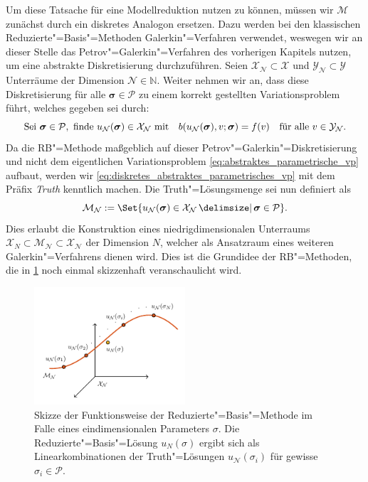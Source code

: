\documentclass[../main.tex]{subfiles}
\begin{document}
Um diese Tatsache für eine Modellreduktion nutzen zu können, müssen wir $\mathcal M$ zunächst durch ein diskretes Analogon ersetzen.
Dazu werden bei den klassischen Reduzierte"=Basis"=Methoden Galerkin"=Verfahren verwendet, weswegen wir an dieser Stelle das Petrov"=Galerkin"=Verfahren des vorherigen Kapitels nutzen, um eine abstrakte Diskretisierung durchzuführen.
Seien $\mathcal X_{\mathcal N} \subset \mathcal X$ und $\mathcal Y_{\mathcal N} \subset \mathcal Y$ Unterräume der Dimension $\mathcal N \in \mathbb{N}$.
Weiter nehmen wir an, dass diese Diskretisierung für alle $\bm \sigma \in \mathcal P$ zu einem korrekt gestellten Variationsproblem führt, welches gegeben sei durch:
\begin{equation}
\label{eq:diskretes_abstraktes_parametrisches_vp}
    \text{Sei } \bm \sigma \in \mathcal P, \text{ finde } u_{\mathcal N}(\bm \sigma) \in \mathcal X_{\mathcal N} \text{ mit} \quad b(u_{\mathcal N}(\bm \sigma), v; \bm \sigma) = f(v) \quad \fa v \in \mathcal Y_{\mathcal N}.
\end{equation}
Da die RB"=Methode maßgeblich auf dieser Petrov"=Galerkin"=Diskretisierung und nicht dem eigentlichen Variationsproblem \cref{eq:abstraktes_parametrische_vp} aufbaut, werden wir \cref{eq:diskretes_abstraktes_parametrisches_vp} mit dem Präfix \emph{Truth} kenntlich machen.
Die Truth"=Lösungsmenge sei nun definiert als
\begin{equation}
\label{eq:truth_loesungsmenge}
    \mathcal M_{\mathcal N} := \Set{u_{\mathcal N}(\bm \sigma) \in \mathcal X_{\mathcal N} \given \bm \sigma \in \mathcal P}.
\end{equation}
Dies erlaubt die Konstruktion eines niedrigdimensionalen Unterraums $\mathcal X_{N} \subset \mathcal M_{\mathcal N} \subset \mathcal X_{\mathcal N}$ der Dimension $N$, welcher als Ansatzraum eines weiteren Galerkin"=Verfahrens dienen wird.
Dies ist die Grundidee der RB"=Methoden, die in \cref{figure:rbm_loesungsmenge} noch einmal skizzenhaft veranschaulicht wird.

\begin{figure}
    \centering
    \includegraphics[width=0.5\textwidth]{figures/rb.pdf}
    \caption[%
    Skizze zur Motivation der Reduzierte-Basis-Methode.
    ]{
        Skizze der Funktionsweise der Reduzierte"=Basis"=Methode im Falle eines eindimensionalen Parameters $\sigma$.
        Die Reduzierte"=Basis"=Lösung $u_{N}(\sigma)$ ergibt sich als Linearkombinationen der Truth"=Lösungen $u_{\mathcal N}(\sigma_{i})$ für gewisse $\sigma_{i} \in \mathcal P$.
        }
    \label{figure:rbm_loesungsmenge}
\end{figure}
\end{document}
